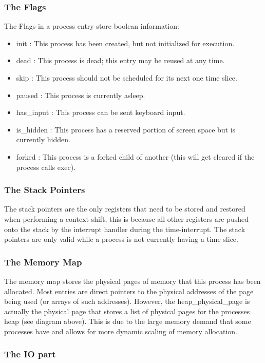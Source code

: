 \documentclass[a4paper]{report}
\begin{document}
\subsubsection{The Flags}

The Flags in a process entry store boolean information:
\begin{itemize}
\item init : This process has been created, but not initialized for execution.
\item dead : This process is dead; this entry may be reused at any time.
\item skip : This process should not be scheduled for its next one time slice.
\item paused : This process is currently asleep.
\item has\_input : This process can be sent keyboard input.
\item is\_hidden : This process has a reserved portion of screen space but is currently hidden.
\item forked : This process is a forked child of another (this will get cleared if the process calls exec).
\end{itemize}

\subsubsection{The Stack Pointers}
The stack pointers are the only registers that need to be stored and restored when performing a context shift, this is because all other registers are pushed onto the stack by the interrupt handler during the time-interrupt. The stack pointers are only valid while a process is not currently having a time slice.

\subsubsection{The Memory Map}

The memory map stores the physical pages of memory that this process has been allocated. Most entries are direct pointers to the physical addresses of the page being used (or arrays of such addresses). However, the heap\_physical\_page is actually the physical page that stores a list of physical pages for the processes heap (see diagram above). This is due to the large memory demand that some processes have and allows for more dynamic scaling of memory allocation.

\subsubsection{The IO part}
\end{document}
